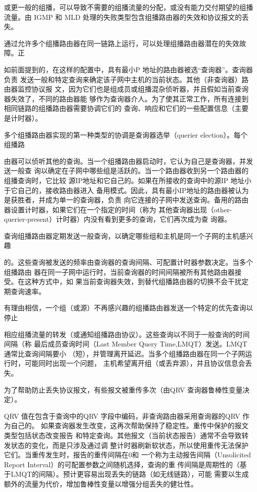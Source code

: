 或更一般的组播，可以导致不需要的组播流量的分配，或没有能力交付期望的组播流量。由
IGMP 和 MLD 处理的失败类型包含组播路由器的失效和协议报文的丢失。

通过允许多个组播路由器在同一链路上运行，可以处理组播路由器潜在的失效故障。正

如前面提到的，在这样的配置中，具有最小P 地址的路由器被选“查询器”。查询器负责
发送一般和特定查询来确定该子网中主机的当前状态。其他（非查询器）路由器监控协议报
文，因为它们也是组成员或组播混杂侦听器，并且假如当前查询器失效了，不同的路由器能
够作为查询器介人。为了使其正常工作，所有连接到相同链路的组播路由器需要协调它们的
查询、响应和它们的一些配置信息（主要是计时器）。

多个组播路由器实现的第一种类型的协调是查询器选举（querier election）。每个组播路

由器可以侦听其他的查询。当一个组播路由器启动时，它认为自己是查询器，并发送一般查
询以确定在子网中哪些组是活跃的。当一个路由器收到另一个路由器的组播查询时，它比较
源IP地址和它自己的。如果在所接收的查询中的源IP 地址小于它自己的，接收路由器进入
备用模式。因此，具有最小IP地址的路由器被认为是获胜者，并成为单一的查询器，负责
向它连接的子网中发送查询。备用的路由器设置计时器，如果它们在一个指定的时间（称为
其他查询器出现（other-querier-present）计时器）内没有看到更多的查询，它们再次成为查
询器。

查询组播路由器定期发送一般查询，以确定哪些组和主机是同一个子网的主机感兴趣

的。这些查询被发送的频率由查询器的查询间隔、可配置计时器参数决定。当多个组播路由
器在同一子网中运行时，当前查询器的时间间隔被所有其他路由器接受。在这种方式中，如
果当前查询器失效，到替代组播路由器的切换不会干扰定期查询速率。

有理由相信，一个组（或源）不再感兴趣的组播路由器发送一个特定的优先查询以停止

相应组播流量的转发（或通知组播路由协议）。这些查询以不同于一般查询的时间间隔（称
最后成员查询时间（Last Member Query Time,LMQT）发送。LMQT 通常比查询间隔要小
（短），并管理离开延迟。当多个组播路由器在同一个子网运行时，可能同时出现一个问题，
主机希望离开组（或丢弃源），并且协议信息会丢失。

为了帮助防止丢失协议报文，有些报文被重传多次（由QRV 查询器鲁棒性变量决定）。

QRV 值在包含于查询中的QRV 字段中编码，非查询路由器采用查询器的QRV 作为自己的。
如果查询器发生改变，这再次帮助保持了稳定性。重传中保护的报文类型包括状态改变报告
和特定查询。其他报文（当前状态报告）通常不会导致转发状态的变化，而是只涉及通过调
整计时器刷新软状态，所以使用重传无法保护它们。当重传发生时，报告的重传间隔在0和
一个称为主动报告间隔（Unsolicited Report Interval）的可配置参数之间随机选择，查询的重
传间隔是周期性的（基于LMQT的间隔）。预计更容易出现丢失的链路（如无线链路），可能
需要以生成额外的流量为代价，增加鲁棒性变量以增强分组丢失的健壮性。

